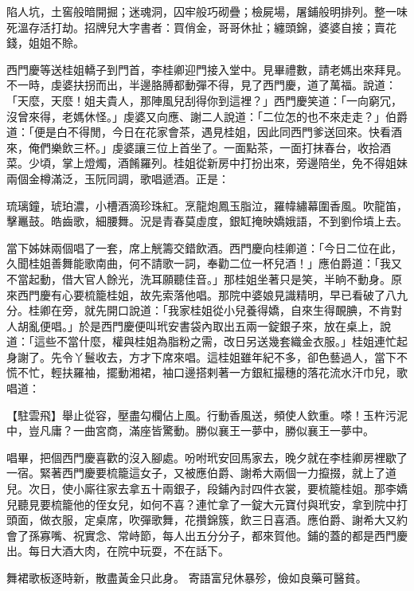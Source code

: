 陷人坑，土窖般暗開掘；迷魂洞，囚牢般巧砌疊；檢屍場，屠鋪般明排列。整一味死溫存活打劫。招牌兒大字書者：買俏金，哥哥休扯；纏頭錦，婆婆自接；賣花錢，姐姐不賒。

西門慶等送桂姐轎子到門首，李桂卿迎門接入堂中。見畢禮數，請老媽出來拜見。不一時，虔婆扶拐而出，半邊胳膊都動彈不得，見了西門慶，道了萬福。說道： 「天麼，天麼！姐夫貴人，那陣風兒刮得你到這裡？」西門慶笑道：「一向窮冗，沒曾來得，老媽休怪。」虔婆又向應、謝二人說道：「二位怎的也不來走走？」伯爵道：「便是白不得閒，今日在花家會茶，遇見桂姐，因此同西門爹送回來。快看酒來，俺們樂飲三杯。」虔婆讓三位上首坐了。一面點茶，一面打抹春台，收拾酒菜。少頃，掌上燈燭，酒餚羅列。桂姐從新房中打扮出來，旁邊陪坐，免不得姐妹兩個金樽滿泛，玉阮同調，歌唱遞酒。正是：

琉璃鐘，琥珀濃，小槽酒滴珍珠紅。烹龍炮鳳玉脂泣，羅幃繡幕圍香風。吹龍笛，擊鼉鼓。皓齒歌，細腰舞。況是青春莫虛度，銀缸掩映嬌娥語，不到劉伶墳上去。

當下姊妹兩個唱了一套，席上觥籌交錯飲酒。西門慶向桂卿道：「今日二位在此，久聞桂姐善舞能歌南曲，何不請歌一詞，奉勸二位一杯兒酒！」應伯爵道：「我又不當起動，借大官人餘光，洗耳願聽佳音。」那桂姐坐著只是笑，半晌不動身。原來西門慶有心要梳籠桂姐，故先索落他唱。那院中婆娘見識精明，早已看破了八九分。桂卿在旁，就先開口說道：「我家桂姐從小兒養得嬌，自來生得靦腆，不肯對人胡亂便唱。」於是西門慶便叫玳安書袋內取出五兩一錠銀子來，放在桌上，說道：「這些不當什麼，權與桂姐為脂粉之需，改日另送幾套織金衣服。」桂姐連忙起身謝了。先令丫鬟收去，方才下席來唱。這桂姐雖年紀不多，卻色藝過人，當下不慌不忙，輕扶羅袖，擺動湘裙，袖口邊搭剌著一方銀紅撮穗的落花流水汗巾兒，歌唱道：

【駐雲飛】舉止從容，壓盡勾欄佔上風。行動香風送，頻使人欽重。嗏！玉杵污泥中，豈凡庸？一曲宮商，滿座皆驚動。勝似襄王一夢中，勝似襄王一夢中。

唱畢，把個西門慶喜歡的沒入腳處。吩咐玳安回馬家去，晚夕就在李桂卿房裡歇了一宿。緊著西門慶要梳籠這女子，又被應伯爵、謝希大兩個一力攛掇，就上了道兒。次日，使小廝往家去拿五十兩銀子，段鋪內討四件衣裳，要梳籠桂姐。那李嬌兒聽見要梳籠他的侄女兒，如何不喜？連忙拿了一錠大元寶付與玳安，拿到院中打頭面，做衣服，定桌席，吹彈歌舞，花攢錦簇，飲三日喜酒。應伯爵、謝希大又約會了孫寡嘴、祝實念、常峙節，每人出五分分子，都來賀他。鋪的蓋的都是西門慶出。每日大酒大肉，在院中玩耍，不在話下。

舞裙歌板逐時新，散盡黃金只此身。
寄語富兒休暴殄，儉如良藥可醫貧。

